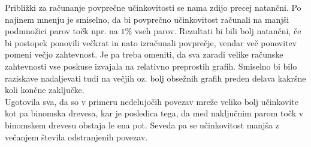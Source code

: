 \documentclass[a4paper, 16pt]{article}
\begin{document}
Približki za računanje povprečne učinkovitosti se nama zdijo precej natančni. Po najinem mnenju je smiselno, da bi povprečno učinkovitost računali na manjši podmnožici parov točk npr. 
na $1\%$ vseh parov. Rezultati bi bili bolj natančni, če bi postopek ponovili večkrat in nato izračunali povprečje, vendar več ponovitev pomeni večjo zahtevnost. Je pa treba omeniti, da sva zaradi velike računske zahtevnosti
vse poskuse izvajala na relativno preprostih grafih. Smiselno bi bilo raziskave nadaljevati tudi na večjih oz. bolj obsežnih grafih preden delava kakršne koli končne zaključke.\\

Ugotovila sva, da so v primeru nedelujočih povezav mreže veliko bolj učinkovite kot pa binomska drevesa, kar je posledica tega, da med naključnim parom točk v binomskem drevesu obstaja le ena pot.
 Seveda pa se učinkovitost manjša z večanjem števila odstranjenih povezav.
\end{document}
